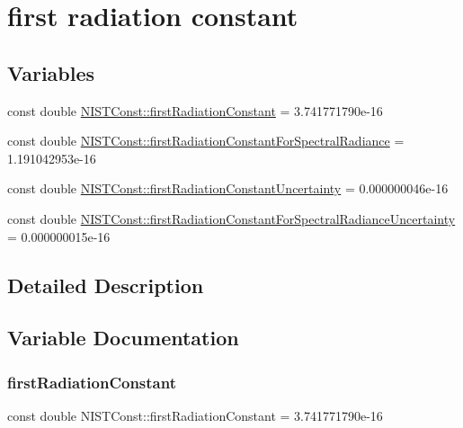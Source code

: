 \hypertarget{group___first_radiation_constant}{}\section{first radiation constant}
\label{group___first_radiation_constant}
\subsection*{Variables}
\begin{DoxyCompactItemize}
\item 
const double \hyperlink{group___first_radiation_constant_ga59a54a84c539969a14695bd822b116cb}{N\+I\+S\+T\+Const\+::first\+Radiation\+Constant} = 3.\+741771790e-\/16
\item 
const double \hyperlink{group___first_radiation_constant_ga877c0bc2579b88ae515b80aeb58aa68e}{N\+I\+S\+T\+Const\+::first\+Radiation\+Constant\+For\+Spectral\+Radiance} = 1.\+191042953e-\/16
\item 
const double \hyperlink{group___first_radiation_constant_ga1b1ea4335364c4f0b19810842fd6c741}{N\+I\+S\+T\+Const\+::first\+Radiation\+Constant\+Uncertainty} = 0.\+000000046e-\/16
\item 
const double \hyperlink{group___first_radiation_constant_gaa5c56cdaf9f43061450ff67b73dbba35}{N\+I\+S\+T\+Const\+::first\+Radiation\+Constant\+For\+Spectral\+Radiance\+Uncertainty} = 0.\+000000015e-\/16
\end{DoxyCompactItemize}


\subsection{Detailed Description}


\subsection{Variable Documentation}
\mbox{\label{group___first_radiation_constant_ga59a54a84c539969a14695bd822b116cb}} 
\subsubsection{\texorpdfstring{first\+Radiation\+Constant}{firstRadiationConstant}}
{\footnotesize\ttfamily const double N\+I\+S\+T\+Const\+::first\+Radiation\+Constant = 3.\+741771790e-\/16}

